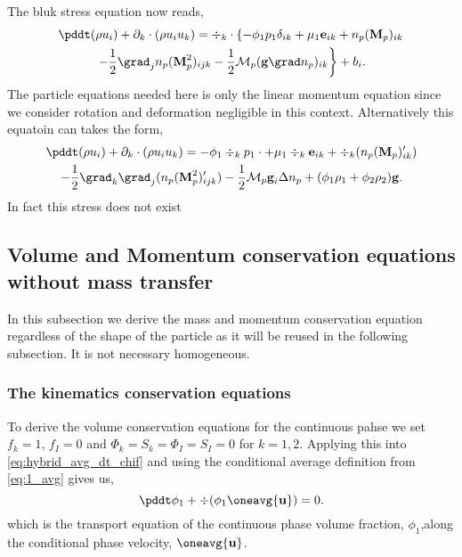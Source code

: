 The bluk stress equation now reads, 
\begin{multline}
    \pddt (\rho u_i)
    + \partial_k \cdot (\rho u_i u_k)
    = 
    \div_k\cdot
    \left\{
    - \phi_1 p_1 \delta_{ik} 
    + \mu_1 \textbf{e}_{ik}
    + n_p (\textbf{M}_p)_{ik}
    \right. \\ \left. 
    - \frac{1}{2}\grad_j n_p (\textbf{M}_p^2)_{ijk}
    - \frac{1}{2}\mathcal{M}_p  (\textbf{g} \grad n_p)_{ik}    
    \right\}
    + b_i. 
\end{multline}
The particle equations needed here is only the linear momentum equation since we consider rotation and deformation  negligible in this context. 
Alternatively this equatoin can takes the form, 
\begin{multline}
    \pddt (\rho u_i)
    + \partial_k \cdot (\rho u_i u_k)
    = 
    - \phi_1 \div_k p_1\cdot
    + \mu_1 \div_k \textbf{e}_{ik}
    + \div_k (n_p (\textbf{M}_p )'_{ik})\\
    - \frac{1}{2}\grad_k\grad_j (n_p (\textbf{M}_p^2)'_{ijk})
    - \frac{1}{2}\mathcal{M}_p  \textbf{g}_i \Delta n_p 
    + (\phi_1 \rho_1 + \phi_2 \rho_2 )\textbf{g}. 
\end{multline}
In fact this stress does not exist
\subsection{Volume and Momentum conservation equations without mass transfer}

In this subsection we derive the mass and momentum conservation equation regardless of the shape of the particle as it will be reused in the following subsection. 
It is not necessary homogeneous. 
\subsubsection{The kinematics   conservation equations}

To derive the volume conservation equations for the continuous pahse we set $f_{k} = 1$, $f_I = 0$ and  $\Phi_{k} = S_{k} =\Phi_{I} = S_{I} = 0$ for $k=1,2$. 
Applying this into \ref{eq:hybrid_avg_dt_chif} and using the conditional average definition from \ref{eq:1_avg} gives us,
\begin{equation}
    \pddt \phi_1
    + \div (\phi_1 \oneavg{\textbf{u}})
    = 0.
    \label{eq:hybrid_avg_dt_chi}
\end{equation}
which is the transport equation of the continuous phase volume fraction, $\phi_1$,along the conditional phase velocity, $\oneavg{\textbf{u}}$. 

